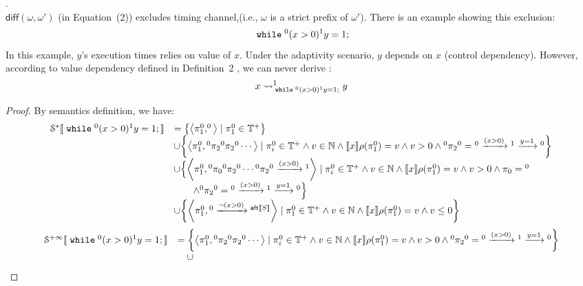  \clearpage
 \begin{example}.
 \label{ex:excltiming}
 \\
 $\mathsf{diff}(\omega, \omega')$ (in \cite{cousot2019abstract} Equation~(2)) excludes timing channel,(i.e., $\omega$ is a strict prefix of $\omega'$). There is an example showing this exclusion: 
 \[
 	\;\mathtt{while}\; {}^0 (x > 0) {}^1 y = 1;
 \]
 In this example, $y$'s execution times relies on value of $x$. Under the adaptivity scenario, $y$ depends on $x$ (control dependency).
 However, according to value dependency defined in Definition~2 \cite{cousot2019abstract}, we can never derive :
 \[
 	x \rightsquigarrow^{1}_{\;\mathtt{while}\; {}^0 (x > 0) {}^1  y = 1;} y
 \]
 \begin{proof}
 By semantics definition, we have:
 \[
 \begin{array}{ll}
 \mathcal{S}^{*} \sem{ \ewhile {}^0 (x > 0) {}^1 y = 1; } 
 & =  \left\{ \left< \pi_1^0, ^0\right> \mid \pi_1^0 \in \mathbb{T^{+}} \right\}
 \\ &  \cup 
 \left\{ \left< \pi_1^0, {}^0 \pi_2 {}^0 \pi_2 {}^0\cdots \right>
 \mid \pi_i^0 \in \mathbb{T^{+}} \land v \in \mathbb{N} \land
 \sem{x}\env(\pi_1^0) = v
 \land v > 0  \land
 {}^0 \pi_2 {}^0 = {}^0 \xrightarrow{(x > 0)} {}^1 \xrightarrow{y = 1} {}^0
 \right\}
 \\ &  \cup 
 \Big\{ \left< \pi_1^0, {}^0 \pi_0 {}^0 \pi_2 {}^0 \cdots {}^0 \pi_2 {}^0 \xrightarrow{(x > 0)} {}^1 \right>
 \mid \pi_i^0 \in \mathbb{T^{+}} \land v \in \mathbb{N} \land
 \sem{x}\env(\pi_1^0) = v
 \land v > 0 \land 
 \pi_0 = {}^0  
 \\ & \qquad \land
 {}^0 \pi_2 {}^0 = {}^0 \xrightarrow{(x > 0)} {}^1 \xrightarrow{y = 1} {}^0
 \Big\}
 \\ & \cup 
 \left\{ \left< \pi_1^0, {}^0 \xrightarrow{\neg(x > 0)} {}^{\mathsf{aft}\sem{S}} \right> 
 \mid \pi_1^0 \in \mathbb{T^{+}} \land v \in \mathbb{N} \land
  \sem{x}\env(\pi_1^0) = v
 \land v \leq 0 \right\}
 \end{array}
 \]
 \begin{equation}
 \label{eq:sem_timingdep}
 \begin{array}{ll}
\mathcal{S}^{+\infty} \sem{ \ewhile {}^0 (x > 0) {}^1 y = 1; } 
& =  
 \left\{ \left< \pi_1^0, {}^0 \pi_2 {}^0 \pi_2 {}^0\cdots \right>
 \mid \pi_i^0 \in \mathbb{T^{+}} \land v \in \mathbb{N} \land
 \sem{x}\env(\pi_1^0) = v
 \land v > 0  \land
 {}^0 \pi_2 {}^0 = {}^0 \xrightarrow{(x > 0)} {}^1 \xrightarrow{y = 1} {}^0
 \right\}
 \\ & \quad \cup 

\end{array}
\end{equation}
\end{proof}
\end{example}
